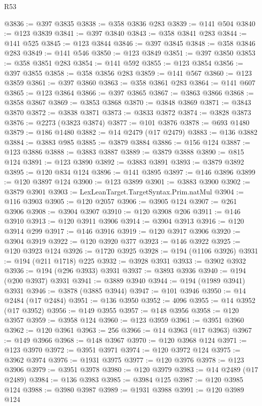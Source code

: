\begin{lexlean}{R53}
\begin{coremodule}
@3836 := @397 @3835
@3838 := @358 @3836 @283
@3839 := @141 @504
@3840 := @123 @3839
@3841 := @397 @3840
@3843 := @358 @3841 @283
@3844 := @141 @525
@3845 := @123 @3844
@3846 := @397 @3845
@3848 := @358 @3846 @283
@3849 := @141 @546
@3850 := @123 @3849
@3851 := @397 @3850
@3853 := @358 @3851 @283
@3854 := @141 @592
@3855 := @123 @3854
@3856 := @397 @3855
@3858 := @358 @3856 @283
@3859 := @141 @567
@3860 := @123 @3859
@3861 := @397 @3860
@3863 := @358 @3861 @283
@3864 := @141 @607
@3865 := @123 @3864
@3866 := @397 @3865
@3867 := @3863 @3866
@3868 := @3858 @3867
@3869 := @3853 @3868
@3870 := @3848 @3869
@3871 := @3843 @3870
@3872 := @3838 @3871
@3873 := @3833 @3872
@3874 := @3828 @3873
@3876 := @2273 (@3823 @3874)
@3877 := @101 @3876
@3878 := @693 @1480
@3879 := @186 @1480
@3882 := @14 @2479 (@17 @2479)
@3883 := @136 @3882
@3884 := @3883 @985
@3885 := @3879 @3884
@3886 := @156 @124
@3887 := @123 @3886
@3888 := @3883 @3887
@3889 := @3879 @3888
@3890 := @815 @124
@3891 := @123 @3890
@3892 := @3883 @3891
@3893 := @3879 @3892
@3895 := @120 @834 @124
@3896 := @141 @3895
@3897 := @146 @3896
@3899 := @120 @3897 @124
@3900 := @123 @3899
@3901 := @3883 @3900
@3902 := @3879 @3901
@3903 := LexLeanTarget.TargetSyntax.Prim.natMul
@3904 := @116 @3903
@3905 := @120 @2057
@3906 := @3905 @124
@3907 := @261 @3906
@3908 := @3904 @3907
@3910 := @120 @3908 @206
@3911 := @146 @3910
@3913 := @120 @3911 @3906
@3914 := @3904 @3913
@3916 := @120 @3914 @299
@3917 := @146 @3916
@3919 := @120 @3917 @3906
@3920 := @3904 @3919
@3922 := @120 @3920 @377
@3923 := @146 @3922
@3925 := @120 @3923 @124
@3926 := @1720 @3925
@3928 := @194 (@1106 @3926)
@3931 := @194 (@211 @1718) @225
@3932 := @3928 @3931
@3933 := @3902 @3932
@3936 := @194 (@296 @3933) @3931
@3937 := @3893 @3936
@3940 := @194 (@200 @3937) @3931
@3941 := @3889 @3940
@3944 := @194 (@1989 @3941) @3931
@3946 := @3878 (@3885 @3944)
@3947 := @101 @3946
@3950 := @14 @2484 (@17 @2484)
@3951 := @136 @3950
@3952 := 4096
@3955 := @14 @3952 (@17 @3952)
@3956 := @149 @3955
@3957 := @148 @3956
@3958 := @120 @3957
@3959 := @3958 @124
@3960 := @123 @3959
@3961 := @3951 @3960
@3962 := @120 @3961
@3963 := 256
@3966 := @14 @3963 (@17 @3963)
@3967 := @149 @3966
@3968 := @148 @3967
@3970 := @120 @3968 @124
@3971 := @123 @3970
@3972 := @3951 @3971
@3974 := @120 @3972 @124
@3975 := @3962 @3974
@3976 := @1931 @3975
@3977 := @120 @3976
@3978 := @123 @3906
@3979 := @3951 @3978
@3980 := @120 @3979
@3983 := @14 @2489 (@17 @2489)
@3984 := @136 @3983
@3985 := @3984 @125
@3987 := @120 @3985 @124
@3988 := @3980 @3987
@3989 := @1931 @3988
@3991 := @120 @3989 @124

\end{coremodule}
\end{lexlean}
